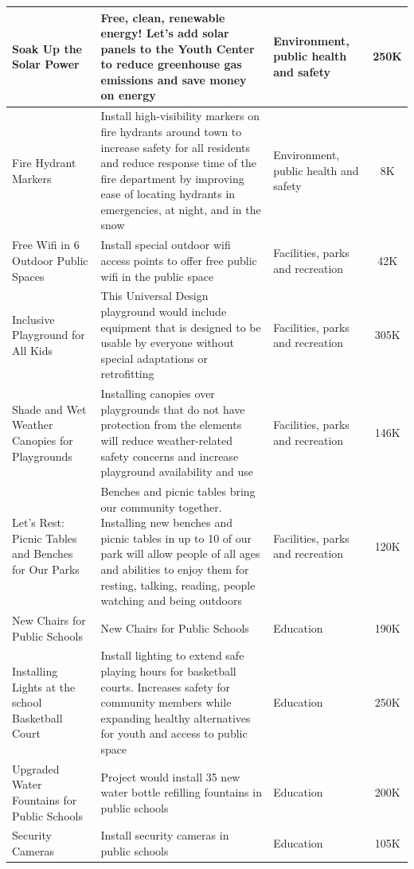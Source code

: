 \documentclass[10pt]{article}
\begin{document}
\begin{appendices}
\begin{longtable}[ht!]{|p{4cm}|p{8cm}|p{3cm}|c|}
    \hline
    Soak Up the Solar Power & Free, clean, renewable energy! Let’s add solar panels to the Youth Center to reduce greenhouse gas emissions and save money on energy & Environment, public health and safety & 250K\\
    \hline
    Fire Hydrant Markers & Install high-visibility markers on fire hydrants around town to increase safety for all residents and reduce response time of the fire department by improving ease of locating hydrants in emergencies, at night, and in the snow & Environment, public health and safety & 8K\\
    \hline
    Free Wifi in 6 Outdoor Public Spaces & Install special outdoor wifi access points to offer free public wifi in the public space & Facilities, parks and recreation & 42K\\
    \hline
    Inclusive Playground for All Kids & This Universal Design playground would include equipment that is designed to be usable by everyone without special adaptations or retrofitting & Facilities, parks and recreation & 305K\\
    \hline
    Shade and Wet Weather Canopies for Playgrounds & Installing canopies over playgrounds that do not have protection from the elements will reduce weather-related safety concerns and increase playground availability and use & Facilities, parks and recreation & 146K\\
    \hline
    Let’s Rest: Picnic Tables and Benches for Our Parks & Benches and picnic tables bring our community together. Installing new benches and picnic tables in up to 10 of our park will allow people of all ages and abilities to enjoy them for resting, talking, reading, people watching and being outdoors & Facilities, parks and recreation & 120K\\
    \hline
    New Chairs for Public Schools & New Chairs for Public Schools & Education & 190K\\
    \hline
    Installing Lights at the school Basketball Court & Install lighting to extend safe playing hours for basketball courts. Increases safety for community members while expanding healthy alternatives for youth and access to public space & Education & 250K\\
    \hline
    Upgraded Water Fountains for Public Schools & Project would install 35 new water bottle refilling fountains in public schools & Education & 200K\\
    \hline
    Security Cameras & Install security cameras in public schools & Education & 105K\\


\end{longtable}
\end{appendices}
\end{document}
